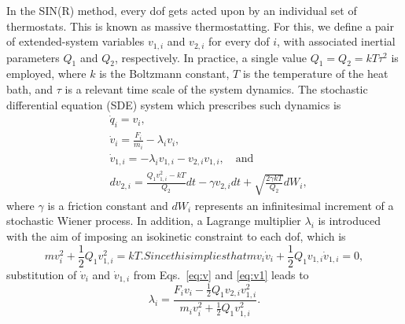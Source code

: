 \documentclass[
    journal=jctcce,
    layout=twocolumn
]{achemso}
\newcommand{\dof}{i}   %
\begin{document}
In the SIN(R) method, every dof gets acted upon by an individual set of thermostats.
This is known as massive thermostatting.
For this, we define a pair of extended-system variables $v_{1,\dof}$ and $v_{2,\dof}$ for every dof $\dof$, with associated inertial parameters $Q_1$ and $Q_2$, respectively.
In practice, a single value $Q_1 = Q_2 = kT\tau^2$ is employed, where $k$ is the Boltzmann constant, $T$ is the temperature of the heat bath, and $\tau$ is a relevant time scale of the system dynamics.
The stochastic differential equation (SDE) system which prescribes such dynamics is
\begin{subequations}
\label{eq:equations of motion}
\begin{align}
& \dot{q}_\dof = v_\dof, \label{eq:q} \\
& \dot{v}_\dof = \frac{F_\dof}{m_\dof} - \lambda_\dof v_\dof, \label{eq:v} \\
& \dot{v}_{1,\dof} = - \lambda_\dof v_{1,\dof} - v_{2,\dof} v_{1,\dof}, \quad \mathrm{and}  \label{eq:v1} \\
& dv_{2,\dof} = \tfrac{Q_1 v_{1,\dof}^2 - kT}{Q_2}dt - \gamma v_{2,\dof} dt + \sqrt{\tfrac{2 \gamma kT}{Q_2}} dW_\dof, \label{eq:v2}
\end{align}
\end{subequations}
where $\gamma$ is a friction constant and $dW_\dof$ represents an infinitesimal increment of a stochastic Wiener process.
In addition, a Lagrange multiplier $\lambda_\dof$ is introduced with the aim of imposing an isokinetic constraint to each dof, which is \cite{Leimkuhler_2013, Margul_2016}
\begin{subequations}
\label{eq:isokinetic constraint}
\begin{equation}
m v_\dof^2 + \frac{1}{2} Q_1 v_{1,\dof}^2 = kT.
\end{equation}

Since this implies that
\begin{equation}
\label{eq:isokinetic constraint derivative}
m v_\dof \dot{v}_\dof + \frac{1}{2} Q_1 v_{1,\dof}\dot{v}_{1,\dof} = 0,
\end{equation}
\end{subequations}
substitution of $\dot{v}_\dof$ and $\dot{v}_{1,\dof}$ from Eqs.~\eqref{eq:v} and \eqref{eq:v1} leads to
\begin{equation}
\lambda_\dof = \frac{F_\dof v_\dof - \frac{1}{2} Q_1 v_{2,\dof} v_{1,\dof}^2}{m_\dof v_\dof^2 + \frac{1}{2} Q_1 v_{1,\dof}^2}.
\end{equation}
\end{document}
